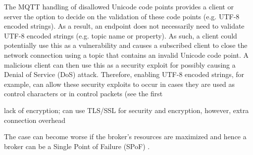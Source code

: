 The MQTT handling of disallowed Unicode code points
provides a client or server the option to decide on the
validation of these code points (e.g. UTF-8 encoded strings).
As a result, an endpoint does not necessarily need to validate
UTF-8 encoded strings (e.g. topic name or property). As
such, a client could potentially use this as a vulnerability and
causes a subscribed client to close the network connection
using a topic that contains an invalid Unicode code point. A
malicious client can then use this as a security exploit for
possibly causing a Denial of Service (DoS) attack.
Therefore, enabling UTF-8 encoded strings, for example,
can allow these security exploits to occur in cases they are
used as control characters or in control packets (see the first
\cite[11]{protocols}

lack of encryption; can use TLS/SSL for security and
encryption, however, extra connection overhead \cite[27]{protocols}

The case can become worse if the broker’s resources are maximized
and hence a broker can be a Single Point of Failure (SPoF) \cite[19]{protocols}.

\nocite{*}

